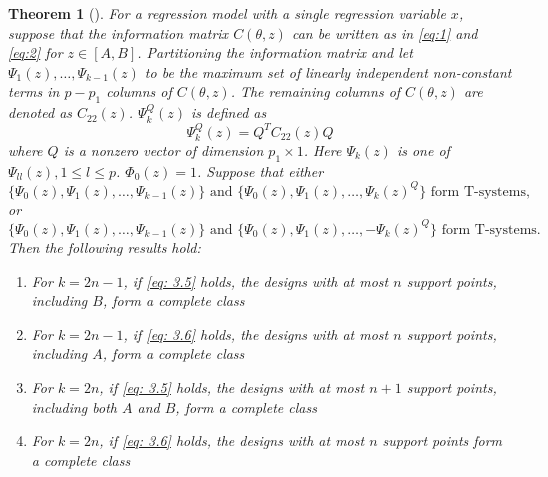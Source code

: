\documentclass[11pt]{amsart}
\newtheorem{theorem}{Theorem}[section]
\theoremstyle{definition}
\theoremstyle{remark}
\numberwithin{equation}{section}
\begin{document}
\begin{theorem}[\cite{yang2012}]\label{2012a}
For a regression model with a single regression variable $x$, suppose that the information matrix $C(\theta,z)$ can be written as in \eqref{eq:1} and \eqref{eq:2} for $z\in[A,B]$. Partitioning the information matrix and let $\Psi_1(z),\ldots,\Psi_{k-1}(z)$ to be the maximum set of linearly independent non-constant terms in $p-p_1$ columns of $C(\theta,z)$. The remaining columns of $C(\theta,z)$ are denoted as $C_{22}(z)$.  $\Psi^Q_{k}(z)$ is defined as \[\Psi_k^Q(z) = Q^TC_{22}(z)Q\] where $Q$ is a nonzero vector of dimension $p_1\times 1$. Here $\Psi_k(z)$ is one of  $\Psi_{ll}(z), 1\le l \le p$. $\Phi_0(z) = 1$.
Suppose that either \begin{equation}\label{eq: 3.5}
    \{\Psi_0(z),\Psi_1(z),\ldots, \Psi_{k-1}(z)\} \text{ and }  \{\Psi_0(z),\Psi_1(z),\ldots, \Psi_k(z)^Q\} \text{ form T-systems,}
\end{equation}or\begin{equation}\label{eq: 3.6}
    \{\Psi_0(z),\Psi_1(z),\ldots,\Psi_{k-1}(z)\} \text{ and }  \{\Psi_0(z),\Psi_1(z),\ldots, -\Psi_k(z)^Q\} \text{ form T-systems.}
\end{equation}
     Then the following results hold:
\begin{enumerate}
    \item [(a)] For $k=2n-1$, if \eqref{eq: 3.5} holds, the designs with at most $n$ support points, including $B$, form a complete class
    
      \item [(b)] For $k=2n-1$, if \eqref{eq: 3.6} holds, the designs with at most $n$ support points, including $A$, form a complete class
      \item [(c)] For $k=2n$, if \eqref{eq: 3.5} holds, the designs with at most $n+1$ support points, including both $A$ and $B$, form a complete class
      \item [(d)] For $k=2n$, if \eqref{eq: 3.6} holds, the designs with at most $n$ support points form a complete class
    
\end{enumerate}
\end{theorem}
\end{document}
